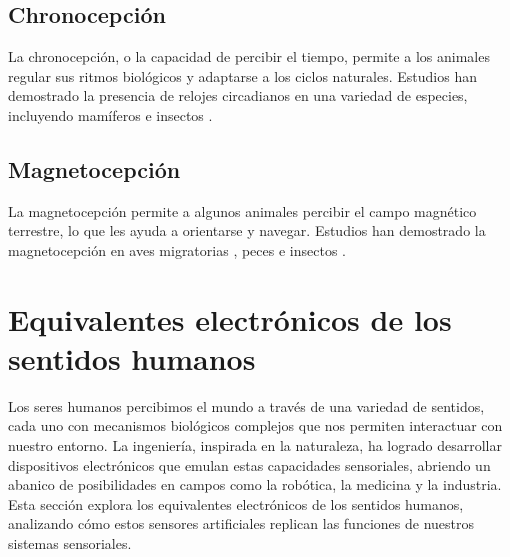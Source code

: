 \documentclass[conference]{IEEEtran}
\begin{document}
\subsection{Chronocepción}

La chronocepción, o la capacidad de percibir el tiempo,  permite a los animales regular sus ritmos biológicos y adaptarse a los ciclos naturales.  Estudios han demostrado la presencia de relojes circadianos en una variedad de especies, incluyendo mamíferos \cite{ralph1990transplanted} e insectos \cite{Saunders2002insect}.

\subsection{Magnetocepción}

La magnetocepción permite a algunos animales percibir el campo magnético terrestre, lo que les ayuda a orientarse y navegar.  Estudios han demostrado la magnetocepción en aves migratorias \cite{wiltschko1972},  peces \cite{Walker1997} e insectos \cite{Gould1980}.



\bigskip
\section{Equivalentes electrónicos de los sentidos humanos}

Los seres humanos percibimos el mundo a través de una variedad de sentidos,  cada uno con mecanismos biológicos complejos que nos permiten interactuar con nuestro entorno.  La ingeniería,  inspirada en la naturaleza,  ha logrado desarrollar dispositivos electrónicos que emulan estas capacidades sensoriales,  abriendo un abanico de posibilidades en campos como la robótica, la medicina y la industria.  Esta sección explora los equivalentes electrónicos de los sentidos humanos,  analizando cómo estos sensores artificiales replican las funciones de nuestros sistemas sensoriales.\\
\end{document}
